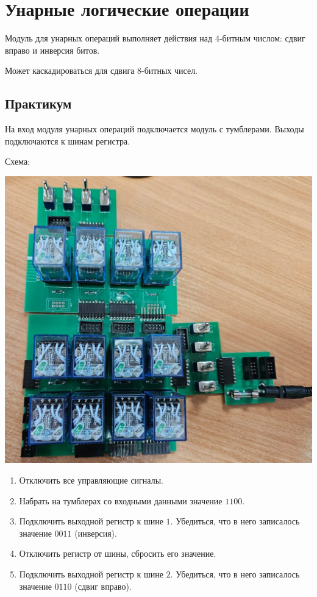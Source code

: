 \documentclass{book}
\begin{document}
\section{Унарные логические операции}

Модуль для унарных операций выполняет действия над $4$-битным числом: сдвиг вправо и инверсия битов.

Может каскадироваться для сдвига $8$-битных чисел.

\subsection{Практикум}

На вход модуля унарных операций подключается модуль с тумблерами.
Выходы подключаются к шинам регистра.

Схема:

\includegraphics[width=\columnwidth]{photo/unary.jpg}

\begin{enumerate}
    \item Отключить все управляющие сигналы.
    \item Набрать на тумблерах со входными данными значение $1100$.
    \item Подключить выходной регистр к шине $1$. Убедиться, что в него записалось значение $0011$ (инверсия).
    \item Отключить регистр от шины, сбросить его значение.
    \item Подключить выходной регистр к шине $2$. Убедиться, что в него записалось значение $0110$ (сдвиг вправо).
\end{enumerate}
\end{document}
